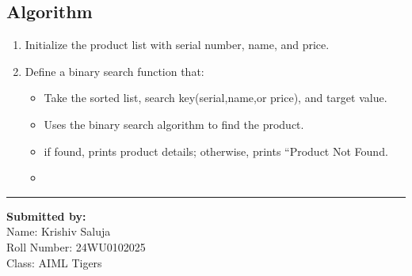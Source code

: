 \documentclass[a4paper,12pt]{article}
\begin{document}
\subsection*{Algorithm}
\begin{enumerate}
    \item Initialize the product list with serial number, name, and price.
    \item Define a binary search function that:
    \begin{itemize}
        \item Take the sorted list, search key(serial,name,or price), and target value.
        \item Uses the binary search algorithm to find the product.
        \item if found, prints product details; otherwise, prints “Product Not Found.
        \item 
    \end{itemize}
\end{enumerate}

\noindent\rule{\textwidth}{1pt}
\vspace{1cm}
\begin{flushleft}
    \textbf{Submitted by:}\\
        Name: Krishiv Saluja\\
        Roll Number: 24WU0102025\\
        Class: AIML Tigers
\end{flushleft}
\end{document}
